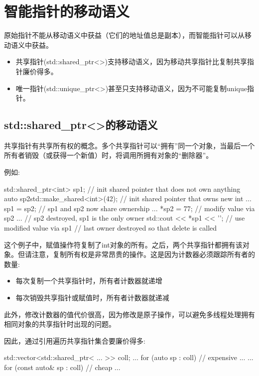\section{智能指针的移动语义}
原始指针不能从移动语义中获益（它们的地址值总是副本），而智能指针可以从移动语义中获益。

\begin{itemize}
	\item 共享指针(std::shared_ptr<>)支持移动语义，因为移动共享指针比复制共享指针廉价得多。
	\item 唯一指针(std::unique_ptr<>)甚至只支持移动语义，因为不可能复制unique指针。
\end{itemize}

\subsection{std::shared_ptr<>的移动语义}

共享指针有共享所有权的概念。多个共享指针可以“拥有”同一个对象，当最后一个所有者销毁（或获得一个新值）时，将调用所拥有对象的“删除器”。

例如:

\begin{cppcode}
{
	std::shared_ptr<int> sp1; // init shared pointer that does not own anything
	{
		auto sp2{std::make_shared<int>(42)}; // init shared pointer that owns new int
		...
		sp1 = sp2; // sp1 and sp2 now share ownership
		...
		*sp2 = 77; // modify value via sp2
		...
	} // sp2 destroyed, sp1 is the only owner
	std::cout << *sp1 << '\n'; // use modified value via sp1
} // last owner destroyed so that delete is called
\end{cppcode}

这个例子中，赋值操作符复制了int对象的所有。之后，两个共享指针都拥有该对象。但请注意，复制所有权是非常昂贵的操作。这是因为计数器必须跟踪所有者的数量:

\begin{itemize}
	\item 每次复制一个共享指针时，所有者计数器就递增
	\item 每次销毁共享指针或赋值时，所有者计数器就递减
\end{itemize}

此外，修改计数器的值代价很高，因为修改是原子操作，可以避免多线程处理拥有相同对象的共享指针时出现的问题。

因此，通过引用遍历共享指针集合要廉价得多:

\begin{cppcode}
std::vector<std::shared_ptr< ... >> coll;
...
for (auto sp : coll) { // expensive
	...
}
...
for (const auto& sp : coll) { // cheap
	...
}
\end{cppcode}

